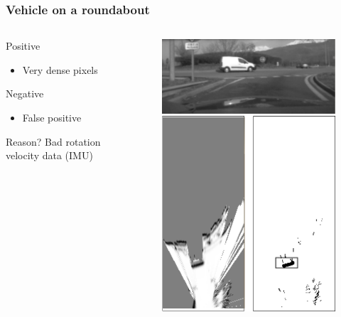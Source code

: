 \documentclass{beamer}
\begin{document}
	\begin{frame}
		\frametitle{Vehicle on a roundabout}
		\begin{columns}[t]
			\begin{column}[t]{5cm}
				\begin{exampleblock}{Positive}
				\begin{itemize}
				\item Very dense pixels
				\end{itemize}
				\end{exampleblock}
								
				\begin{alertblock}{Negative}
				\begin{itemize}
				\item False positive 
				\end{itemize}
				\end{alertblock}					
				\begin{block}{Reason?}
				Bad rotation velocity data (IMU)
				\end{block}			
			\end{column}
			\begin{column}[t]{5cm}
				\begin{figure}[h]
				\center
				\includegraphics[scale=0.55]{../img/fig:result:scenetwocarrondepoint}
				\end{figure}
			\end{column}
		\end{columns}
	\end{frame}
\end{document}
